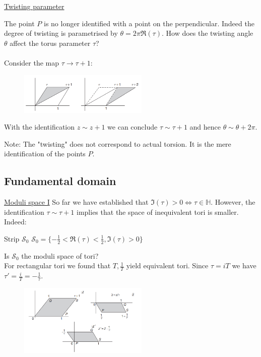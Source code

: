 \documentclass[11pt,aspectratio=169]{beamer}
\begin{document}
\begin{frame}{\underline{Twisting parameter}}

	
	The point $P$ is no longer identified with a point on the perpendicular. Indeed the degree of twisting is parametrised by $\theta = 2\pi \Re(\tau)$.
	How does the twisting angle $\theta$ affect the torus parameter $\tau$?
	\\~\\
	Consider the map $\tau \rightarrow \tau + 1$:
	\begin{figure}[htbp]
		\centering
		\includegraphics[width = 0.55\textwidth]{elements/tau map.PNG}
	\end{figure}
	With the identification $z \sim z + 1$ we can conclude $\tau \sim \tau + 1$ and hence $\theta \sim \theta + 2\pi$.
	\begin{block}{Note:}
		The "twisting" does not correspond to actual torsion. It is the mere identification of the points $P$.
	\end{block}
\end{frame}

\subsection{Fundamental domain}
\begin{frame}{\underline{Moduli space I}}
	So far we have established that $\Im(\tau) > 0 \Leftrightarrow \tau \in \mathbb{H}$.
	However, the identification $\tau \sim \tau + 1$ implies that the space of inequivalent tori is smaller. Indeed:
	\begin{block}{Strip $\mathcal{S}_{0}$}
		$\mathcal{S}_{0} = \{-\frac{1}{2} < \Re(\tau) < \frac{1}{2}, \Im(\tau) > 0\}$
	\end{block}
	Is $\mathcal{S}_{0}$ the moduli space of tori?
	\\
	For rectangular tori we found that $T, \frac{1}{T}$ yield equivalent tori. Since $\tau = iT$ we have $\tau' = \frac{i}{T} = -\frac{1}{\tau}$.
	\begin{figure}[htbp]
		\centering
		\includegraphics[width = 0.55\textwidth]{elements/s module trans.PNG}
	\end{figure}
\end{frame}
\end{document}
